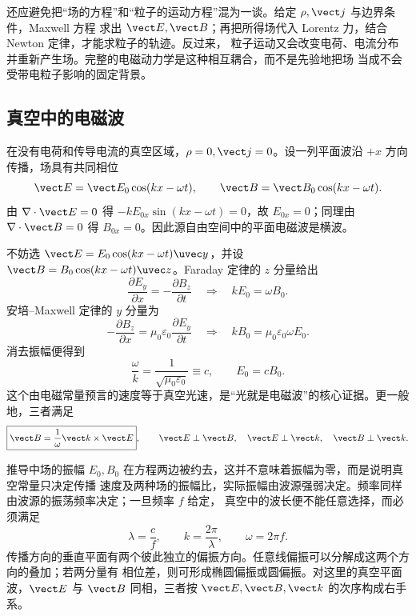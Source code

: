 还应避免把“场的方程”和“粒子的运动方程”混为一谈。给定 $\rho,\vect j$ 与边界条件，Maxwell 方程
求出 $\vect E,\vect B$；再把所得场代入 Lorentz 力，结合 Newton 定律，才能求粒子的轨迹。反过来，
粒子运动又会改变电荷、电流分布并重新产生场。完整的电磁动力学是这种相互耦合，而不是先验地把场
当成不会受带电粒子影响的固定背景。

\subsection*{真空中的电磁波}

在没有电荷和传导电流的真空区域，$\rho=0,\vect j=0$。设一列平面波沿 $+x$ 方向传播，场具有共同相位
\begin{equation}
  \vect E=\vect E_0\cos(kx-\omega t),
  \qquad
  \vect B=\vect B_0\cos(kx-\omega t).
\end{equation}
由 $\nabla\cdot\vect E=0$ 得 $-kE_{0x}\sin(kx-\omega t)=0$，故 $E_{0x}=0$；同理由
$\nabla\cdot\vect B=0$ 得 $B_{0x}=0$。因此源自由空间中的平面电磁波是横波。

不妨选 $\vect E=E_0\cos(kx-\omega t)\uvec y$，并设
$\vect B=B_0\cos(kx-\omega t)\uvec z$。Faraday 定律的 $z$ 分量给出
\begin{equation}
  \frac{\partial E_y}{\partial x}=-\frac{\partial B_z}{\partial t}
  \quad\Longrightarrow\quad
  kE_0=\omega B_0.
\end{equation}
安培--Maxwell 定律的 $y$ 分量为
\begin{equation}
  -\frac{\partial B_z}{\partial x}
  =\mu_0\varepsilon_0\frac{\partial E_y}{\partial t}
  \quad\Longrightarrow\quad
  kB_0=\mu_0\varepsilon_0\omega E_0.
\end{equation}
消去振幅便得到
\begin{equation}
  \boxed{\frac{\omega}{k}=\frac{1}{\sqrt{\mu_0\varepsilon_0}}\equiv c},
  \qquad
  \boxed{E_0=cB_0}.
\end{equation}
这个由电磁常量预言的速度等于真空光速，是“光就是电磁波”的核心证据。更一般地，三者满足
\begin{equation}
  \boxed{\vect B=\frac{1}{\omega}\vect k\times\vect E},
  \qquad
  \vect E\perp\vect B,\quad \vect E\perp\vect k,
  \quad \vect B\perp\vect k.
\end{equation}

推导中场的振幅 $E_0,B_0$ 在方程两边被约去，这并不意味着振幅为零，而是说明真空常量只决定传播
速度及两种场的振幅比，实际振幅由波源强弱决定。频率同样由波源的振荡频率决定；一旦频率 $f$ 给定，
真空中的波长便不能任意选择，而必须满足
\begin{equation}
  \lambda=\frac{c}{f},\qquad k=\frac{2\pi}{\lambda},\qquad \omega=2\pi f.
\end{equation}
传播方向的垂直平面有两个彼此独立的偏振方向。任意线偏振可以分解成这两个方向的叠加；若两分量有
相位差，则可形成椭圆偏振或圆偏振。对这里的真空平面波，$\vect E$ 与 $\vect B$ 同相，三者按
$\vect E,\vect B,\vect k$ 的次序构成右手系。

